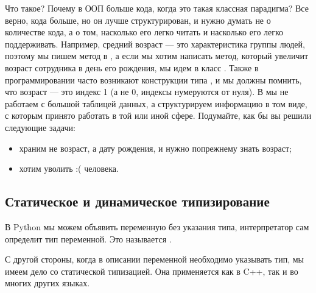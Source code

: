 \documentclass[letterpaper,10pt,russian]{sphinxmanual}
\begin{document}
\sphinxAtStartPar
Что такое? Почему в ООП больше кода, когда это такая классная парадигма? Все верно, кода больше, но он лучше структурирован, и нужно думать не о количестве кода, а о том, насколько его легко читать и насколько его легко поддерживать. Например, средний возраст — это характеристика группы людей, поэтому мы пишем метод в , а если мы хотим написать метод, который увеличит возраст сотрудника в день его рождения, мы идем в класс . Также в  программировании часто возникают конструкции типа , и мы должны помнить, что возраст — это индекс 1 (а не 0, индексы нумеруются от нуля). В  мы не работаем с большой таблицей данных, а структурируем информацию в том виде, с которым принято работать в той или иной сфере. Подумайте, как бы вы решили следующие задачи:
\begin{itemize}
\item {} 
\sphinxAtStartPar
храним не возраст, а дату рождения, и нужно по\sphinxhyphen{}прежнему знать возраст;

\item {} 
\sphinxAtStartPar
хотим уволить :( человека.

\end{itemize}


\subsection{Статическое и динамическое типизирование}
\label{\detokenize{educational_materials/terms/content:id3}}
\sphinxAtStartPar
В Python мы можем объявить переменную без указания типа, интерпретатор сам определит тип переменной. Это называется .

\begin{sphinxVerbatim}[commandchars=\\\{\}]
   
      
\end{sphinxVerbatim}

\sphinxAtStartPar
С другой стороны, когда в описании переменной необходимо указывать тип, мы имеем дело со статической типизацией. Она применяется как в C++, так и во многих других языках.
\end{document}
